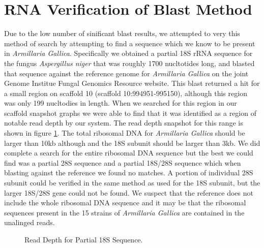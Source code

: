 \documentclass[12pt]{article}
\begin{document}
%
%
\section{RNA Verification of Blast Method}
	Due to the low number of sinificant blast results, we attempted to very this method of search by attempting to find a sequence which we know to be present in \textit{Armillaria Gallica}. Specifically we obtained a partial 18S rRNA sequence for the fungus \textit{Aspergillus niger} that was roughly 1700 nucltotides long, and blasted that sequence against the reference genome for \textit{Armillaria Gallica} on the joint Genome Institue Fungal Genomics Resource website. This blast returned a hit for a small region on scaffold 10 (scaffold 10:994951-995150), although this region was only 199 nucltodies in length. When we searched for this region in our scaffold snapshot graphs we were able to find that it was identified as a region of notable read depth by our system. The read depth snapshot for this range is shown in figure \ref{rdsnp18Srrna}. The total ribosomal DNA for \textit{Armillaria Gallica} should be larger than 10kb although and the 18S subunit should be larger than 3kb. We did complete a search for the entire ribosomal DNA sequence but the best we could find was a partial 28S sequence and a partial 18S/28S sequence which when blasting against the reference we found no matches. A portion of individual 28S subunit could be verified in the same method as used for the 18S subunit, but the larger 18S/28S gene could not be found. We suspect that the reference does not include the whole ribosomal DNA sequence and it may be that the ribosomal sequences present in the 15 strains of \textit{Armillaria Gallica} are contained in the unalinged reads. 
      \begin{figure}[H]
	\begin{centering}
 		\begin{singlespace}
			\vspace{-0.5cm}
			\caption[Read Depth for Partial 18S Sequence.]{Read Depth for Partial 18S Sequence.}\label{rdsnp18Srrna}
		\end{singlespace}
	\end{centering}
\end{figure}
%
%
\end{document}
